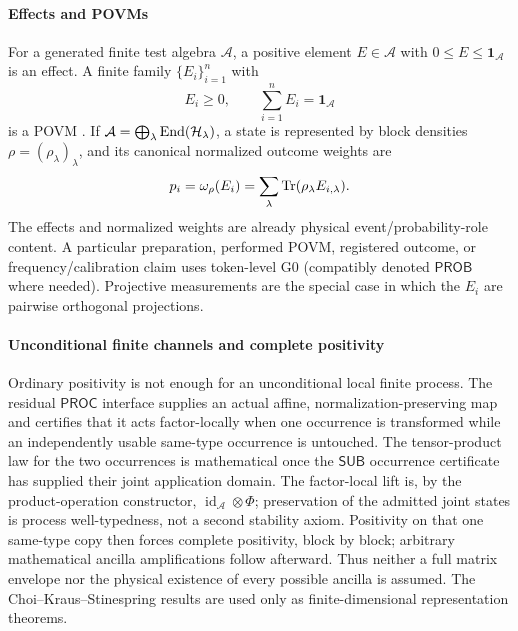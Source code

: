 \documentclass[12pt,a4paper]{article}
\begin{document}
\paragraph{Effects and POVMs}
\label{p4:sec:part1-povm}

For a generated finite test algebra \(\mathcal A\), a positive element
\(E\in\mathcal A\) with \(0\le E\le\mathbf1_{\mathcal A}\) is an effect.
A finite family $\{E_i\}_{i=1}^n$ with
\begin{equation}
\label{p4:eq:povm}
E_i\ge0,
\qquad
\sum_{i=1}^n E_i=\mathbf1_{\mathcal A}
\end{equation}
is a POVM \cite{Naimark1940,Holevo1982,Kraus1983}.  If
\(\mathcal A=\bigoplus_\lambda\operatorname{End}(\mathcal H_\lambda)\), a state is
represented by block densities \(\rho=(\rho_\lambda)_\lambda\), and its
canonical normalized outcome weights are
\begin{equation}
\label{p4:eq:povm-prob}
p_i=\omega_\rho(E_i)
=\sum_\lambda\operatorname{Tr}(\rho_\lambda E_{i,\lambda}).
\end{equation}
The effects and normalized weights are already physical event/probability-role
content.  A particular preparation, performed POVM, registered outcome, or
frequency/calibration claim uses token-level G0 (compatibly denoted
\(\mathsf{PROB}\) where needed).  Projective measurements are the special case
in which the $E_i$ are pairwise orthogonal projections.



\paragraph{Unconditional finite channels and complete positivity}
\label{p4:sec:part1-cp}

Ordinary positivity is not enough for an unconditional local finite process.
The residual \(\mathsf{PROC}\) interface supplies an actual affine,
normalization-preserving map and certifies that it acts factor-locally when
one occurrence is transformed while an independently usable same-type
occurrence is untouched.
The tensor-product law for the two occurrences is mathematical once the
\(\mathsf{SUB}\) occurrence certificate has supplied their joint application
domain.  The factor-local lift is, by the product-operation constructor,
\(\operatorname{id}_{\mathcal A}\otimes\Phi\); preservation of the admitted
joint states is process well-typedness, not a second stability axiom.
Positivity on that one same-type copy then forces complete
positivity, block by block; arbitrary mathematical ancilla amplifications
follow afterward.  Thus neither a full matrix envelope nor the physical
existence of every possible ancilla is assumed.  The
Choi--Kraus--Stinespring results
\cite{Stinespring1955,Choi1975,Kraus1983} are used only as
finite-dimensional representation theorems.
\end{document}

